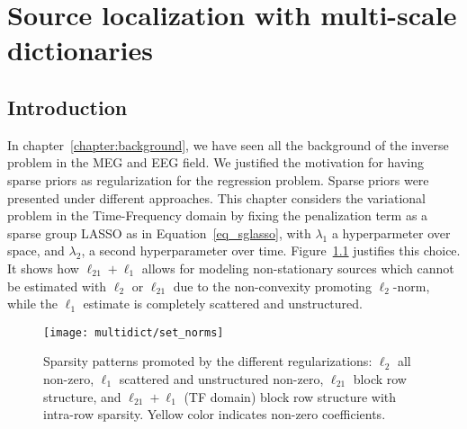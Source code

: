
\chapter{Source localization with multi-scale dictionaries} %

\label{chapter:multiscale} %
\noindent\makebox[\linewidth]{\rule{0.75\paperwidth}{0.4pt}}
\noindent\makebox[\linewidth]{\rule{0.75\paperwidth}{0.4pt}}

\localtableofcontents %

\noindent\makebox[\linewidth]{\rule{0.75\paperwidth}{0.4pt}}
\noindent\makebox[\linewidth]{\rule{0.75\paperwidth}{0.4pt}}
\newpage

\section{Introduction}
In chapter~\ref{chapter:background}, we have seen all the background of the inverse problem in the MEG and EEG field. We justified the motivation for having sparse priors as regularization for the regression problem. Sparse priors were presented under different approaches. This chapter considers the variational problem in the Time-Frequency domain by fixing the penalization term as a sparse group LASSO as in Equation~\eqref{eq_sglasso}, with $\lambda_1$ a hyperparmeter over space, and $\lambda_2$, a second hyperparameter over time. Figure~\ref{fig:set_norms} justifies this choice. It shows how $\ell_{21}+\ell_1$ allows for modeling non-stationary sources which cannot be estimated with $\ell_2$ or $\ell_{21}$ due to the non-convexity promoting $\ell_2$-norm, while the $\ell_1$ estimate is completely scattered and unstructured.\\

\begin{figure}
\centering
	\texttt{[image: multidict/set\_norms]}
    \caption{Sparsity patterns promoted by the different regularizations: $\ell_2$ all non-zero, $\ell_1$ scattered and unstructured non-zero, $\ell_{21}$ block row structure, and $\ell_{21} + \ell_1$ (TF domain) block row structure with intra-row sparsity. Yellow color indicates non-zero coefficients.}
    \label{fig:set_norms}
\end{figure}

